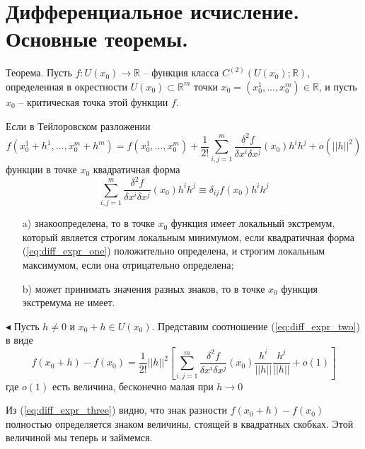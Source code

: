 \documentclass[a4paper, 12pt]{article} %
\begin{document}
\clearpage
\section*{Дифференциальное исчисление. Основные теоремы.}
Теорема. Пусть $f: U(x_0) \to \mathbb{R}$ -- функция класса $C^{(2)}(U(x_0); \mathbb{R})$, определенная в окрестности $U(x_0) \subset \mathbb{R}^m$ точки $x_0 = (x^1_0, ...,x^m_0) \in \mathbb{R}$, и пусть $x_0$ -- критическая точка этой функции $f$.

Если в Тейлоровском разложении
\begin{equation}
    f(x^1_0+h^1, ..., x_0^m+h^m) = f(x_0^1, ..., x^m_0) + \frac{1}{2!} \sum^m_{i, j = 1} \frac{\delta^2 f}{\delta x^i \delta x^j} (x_0)h^i h^j + o(||h||^2)
    \label{eq:diff_expr_two}
\end{equation}
функции в точке $x_0$ квадратичная форма
\begin{equation}
    \sum_{i,j = 1}^m \frac{\delta^2 f}{\delta x^i \delta x^j} (x_0) h^i h^j \equiv \delta_{ij} f(x_0) h^i h^j
    \label{eq:diff_expr_one}
\end{equation}
\begin{enumerate}
    \item [a)] знакоопределена, то в точке $x_0$ функция имеет локальный экстремум, который является строгим локальным минимумом, если квадратичная форма (\ref{eq:diff_expr_one}) положительно определена, и строгим локальным максимумом, если она отрицательно определена;
    \item [b)] может принимать значения разных знаков, то в точке $x_0$ функция экстремума не имеет.
\end{enumerate}

$ \blacktriangleleft $ Пусть $h \neq 0$ и $x_0 + h \in U(x_0)$. Представим соотношение (\ref{eq:diff_expr_two}) в виде
\begin{equation}
    f(x_0 + h) - f(x_0) = \frac{1}{2!} ||h||^2 \left[ \sum^m_{i, j = 1} \frac{\delta^2 f}{\delta x^i \delta x^j} (x_0) \frac{h^i}{||h||} \frac{h^j}{||h||} + o(1) \right]
    \label{eq:diff_expr_three}
\end{equation}
где $o(1)$ есть величина, бесконечно малая при $h \to 0$

Из (\ref{eq:diff_expr_three}) видно, что знак разности $f(x_0 + h) - f(x_0)$ полностью определяется знаком величины, стоящей в квадратных скобках. Этой величиной мы теперь и займемся.

\clearpage
\end{document}
